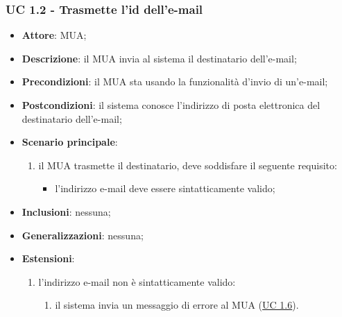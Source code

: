     \subsubsection{UC 1.2 - Trasmette l'id dell'e-mail} \label{sec:UC1.2}
    \begin{itemize}
        \item \textbf{Attore}: MUA;
        \item \textbf{Descrizione}: il MUA invia al sistema il destinatario dell'e-mail;
        \item \textbf{Precondizioni}: il MUA sta usando la funzionalità d'invio di un'e-mail;
        \item \textbf{Postcondizioni}: il sistema conosce l'indirizzo di posta elettronica del destinatario dell'e-mail;
        \item \textbf{Scenario principale}:
            \begin{enumerate}
                \item il MUA trasmette il destinatario, deve soddisfare il seguente requisito:
                    \begin{itemize}
                        \item l'indirizzo e-mail deve essere sintatticamente valido;
                    \end{itemize}
            \end{enumerate}
        \item \textbf{Inclusioni}: nessuna;
        \item \textbf{Generalizzazioni}: nessuna;
        \item \textbf{Estensioni}:
            \begin{enumerate}[label=\alph*.]
                \item l'indirizzo e-mail non è sintatticamente valido:
                \begin{enumerate}[label=\arabic*.]
                    \item il sistema invia un messaggio di errore al MUA (\hyperref[sec:UC1.6]{UC 1.6}).
                \end{enumerate}
            \end{enumerate}
    \end{itemize}

